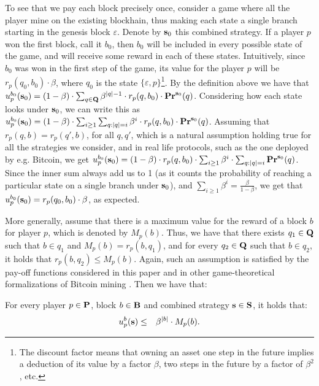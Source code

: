 To see that we pay each block precisely once, consider a game where all the player mine on the existing blockhain, thus making each state a single branch starting in the genesis block $\varepsilon$. Denote by $\mathbf{s}_0$ this combined strategy. If a player $p$ won the first block, call it $b_0$, then $b_0$ will be included in every possible state of the game, and will receive some reward in each of these states. Intuitively, since $b_0$ was won in the first step of the game, its value for the player $p$ will be $r_p(q_0,b_0) \cdot \beta$, where $q_0$ is the state $\{\varepsilon,p\}$\footnote{The discount factor means that owning an asset one step in the future implies a deduction of its value by a factor $\beta$, two steps in the future by a factor of $\beta^2$, etc.}. By the definition above we have that $u_p^{b_0}(\mathbf{s}_0) = (1-\beta) \cdot \sum_{q\in \mathbf{Q}} \beta^{|q|-1}\cdot r_p(q,b_0)\cdot \mathbf{Pr}^{\mathbf{s}_0}(q)$. Considering how each state looks under $\mathbf{s}_0$, we can write this as $u_p^{b_0}(\mathbf{s}_0) = (1-\beta)\cdot\sum_{i\geq 1} \sum_{q : |q| = i }\beta^i\cdot r_p(q,b_0)\cdot \mathbf{Pr}^{\mathbf{s}_0}(q)$. Assuming that $r_p(q,b)=r_p(q',b)$, for all $q,q'$, which is a natural assumption holding true for all the strategies we consider, and in real life protocols, such as the one deployed by e.g. Bitcoin, we get $u_p^{b_0}(\mathbf{s}_0) = (1-\beta)\cdot r_p(q,b_0)\cdot \sum_{i\geq 1}\beta^i\cdot \sum_{q : |q| = i } \mathbf{Pr}^{\mathbf{s}_0}(q)$. Since the inner sum always add us to 1 (as it counts the probability of reaching a particular state on a single branch under $\mathbf{s}_0$), and $\sum_{i\geq 1}\beta^i = \frac{\beta}{1-\beta}$, we get that $u_p^{b_0}(\mathbf{s}_0) = r_p(q_0,b_0) \cdot \beta$, as expected.

More generally, assume that there is a maximum value for the reward of a block $b$ for player $p$, which is denoted by $M_p(b)$. Thus, we have that there exists $q_1 \in \mathbf{Q}$ such that $b \in q_1$ and $M_p(b) = r_p(b,q_1)$, and for every $q_2 \in \mathbf{Q}$ such that $b \in q_2$, it holds that $r_p(b,q_2) \leq M_p(b)$. Again, such an assumption is satisfied by the pay-off functions considered in this paper and in other game-theoretical formalizations of Bitcoin mining \cite{mininggames:2016}. Then we have that:
\begin{myprop}\label{prop-ub-block}
For every player $p \in \mathbf{P}$, block $b \in \mathbf{B}$ and combined strategy $\mathbf{s} \in \mathbf{S}$, it holds that:
\begin{eqnarray*}
u^b_p(\mathbf{s}) & \leq &  \beta^{|b|} \cdot M_p(b).
\end{eqnarray*}
\end{myprop}



